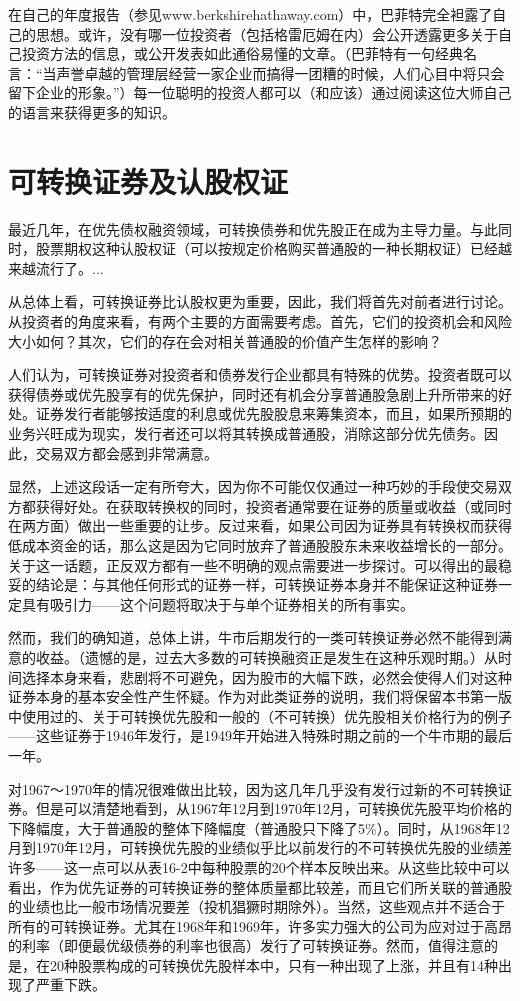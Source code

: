 \documentclass[12pt,oneside]{book}
\begin{document}
在自己的年度报告（参见www.berkshirehathaway.com）中，巴菲特完全袒露了自己的思想。或许，没有哪一位投资者（包括格雷厄姆在内）会公开透露更多关于自己投资方法的信息，或公开发表如此通俗易懂的文章。（巴菲特有一句经典名言：“当声誉卓越的管理层经营一家企业而搞得一团糟的时候，人们心目中将只会留下企业的形象。”）每一位聪明的投资人都可以（和应该）通过阅读这位大师自己的语言来获得更多的知识。



\section{可转换证券及认股权证}
最近几年，在优先债权融资领域，可转换债券和优先股正在成为主导力量。与此同时，股票期权这种认股权证（可以按规定价格购买普通股的一种长期权证）已经越来越流行了。...

从总体上看，可转换证券比认股权更为重要，因此，我们将首先对前者进行讨论。从投资者的角度来看，有两个主要的方面需要考虑。首先，它们的投资机会和风险大小如何？其次，它们的存在会对相关普通股的价值产生怎样的影响？

人们认为，可转换证券对投资者和债券发行企业都具有特殊的优势。投资者既可以获得债券或优先股享有的优先保护，同时还有机会分享普通股急剧上升所带来的好处。证券发行者能够按适度的利息或优先股股息来筹集资本，而且，如果所预期的业务兴旺成为现实，发行者还可以将其转换成普通股，消除这部分优先债务。因此，交易双方都会感到非常满意。

显然，上述这段话一定有所夸大，因为你不可能仅仅通过一种巧妙的手段使交易双方都获得好处。在获取转换权的同时，投资者通常要在证券的质量或收益（或同时在两方面）做出一些重要的让步。反过来看，如果公司因为证券具有转换权而获得低成本资金的话，那么这是因为它同时放弃了普通股股东未来收益增长的一部分。关于这一话题，正反双方都有一些不明确的观点需要进一步探讨。可以得出的最稳妥的结论是：与其他任何形式的证券一样，可转换证券本身并不能保证这种证券一定具有吸引力——这个问题将取决于与单个证券相关的所有事实。

然而，我们的确知道，总体上讲，牛市后期发行的一类可转换证券必然不能得到满意的收益。（遗憾的是，过去大多数的可转换融资正是发生在这种乐观时期。）从时间选择本身来看，悲剧将不可避免，因为股市的大幅下跌，必然会使得人们对这种证券本身的基本安全性产生怀疑。作为对此类证券的说明，我们将保留本书第一版中使用过的、关于可转换优先股和一般的（不可转换）优先股相关价格行为的例子——这些证券于1946年发行，是1949年开始进入特殊时期之前的一个牛市期的最后一年。

对1967～1970年的情况很难做出比较，因为这几年几乎没有发行过新的不可转换证券。但是可以清楚地看到，从1967年12月到1970年12月，可转换优先股平均价格的下降幅度，大于普通股的整体下降幅度（普通股只下降了5\%）。同时，从1968年12月到1970年12月，可转换优先股的业绩似乎比以前发行的不可转换优先股的业绩差许多——这一点可以从表16-2中每种股票的20个样本反映出来。从这些比较中可以看出，作为优先证券的可转换证券的整体质量都比较差，而且它们所关联的普通股的业绩也比一般市场情况要差（投机猖獗时期除外）。当然，这些观点并不适合于所有的可转换证券。尤其在1968年和1969年，许多实力强大的公司为应对过于高昂的利率（即便最优级债券的利率也很高）发行了可转换证券。然而，值得注意的是，在20种股票构成的可转换优先股样本中，只有一种出现了上涨，并且有14种出现了严重下跌。
\end{document}
